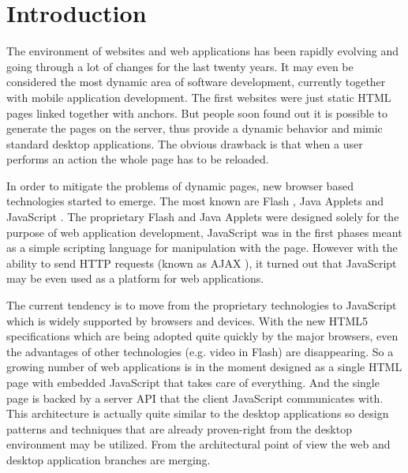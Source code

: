 \documentclass[12pt,a4paper]{report}
\begin{document}
\newpage
\pagestyle{plain}
\setcounter{page}{1}
\tableofcontents



\chapter{Introduction}

The environment of websites and web applications has been rapidly evolving and going through a lot of changes for the last twenty years. It may even be considered the most dynamic area of software development, currently together with mobile application development. The first websites were just static HTML pages linked together with anchors. But people soon found out it is possible to generate the pages on the server, thus provide a dynamic behavior and mimic standard desktop applications. The obvious drawback is that when a user performs an action the whole page has to be reloaded. 

In order to mitigate the problems of dynamic pages, new browser based technologies started to emerge. The most known are Flash \cite{Flash}, Java Applets \cite{JavaApplets} and JavaScript \cite{JavaScript} \cite{EcmaScript}. The proprietary Flash and Java Applets were designed solely for the purpose of web application development, JavaScript was in the first phases meant as a simple scripting language for manipulation with the page. However with the ability to send HTTP requests (known as AJAX \cite{Ajax}), it turned out that JavaScript may be even used as a platform for web applications. 

The current tendency is to move from the proprietary technologies to JavaScript which is widely supported by browsers and devices. With the new HTML5 \cite{Html5} specifications which are being adopted quite quickly by the major browsers, even the advantages of other technologies (e.g. video in Flash) are disappearing. So a growing number of web applications is in the moment designed as a single HTML page with embedded JavaScript that takes care of everything. And the single page is backed by a server API that the client JavaScript communicates with. This architecture is actually quite similar to the desktop applications so design patterns and techniques that are already proven-right from the desktop environment may be utilized. From the architectural point of view the web and desktop application branches are merging.
\end{document}
